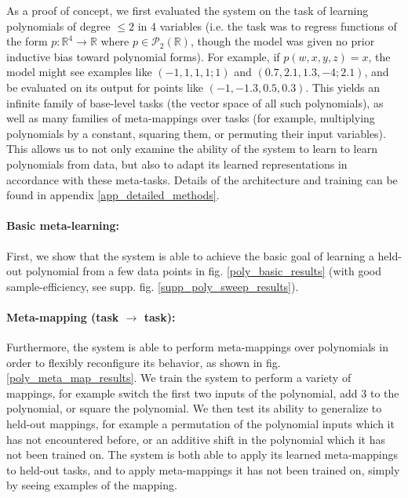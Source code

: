 \documentclass{article}
\begin{document}
As a proof of concept, we first evaluated the system on the task of learning polynomials of degree $\leq 2$ in 4 variables (i.e. the task was to regress functions of the form $p: \mathbb{R}^4 \rightarrow \mathbb{R}$ where $p \in \mathcal{P}_2 \left(\mathbb{R}\right)$, though the model was given no prior inductive bias toward polynomial forms). For example, if $p(w,x,y,z) = x$, the model might see examples like $(-1,1,1,1; 1)$ and $(0.7, 2.1, 1.3, -4; 2.1)$, and be evaluated on its output for points like $(-1, -1.3, 0.5, 0.3)$. This yields an infinite family of base-level tasks (the vector space of all such polynomials), as well as many families of meta-mappings over tasks (for example, multiplying polynomials by a constant, squaring them, or permuting their input variables). This allows us to not only examine the ability of the system to learn to learn polynomials from data, but also to adapt its learned representations in accordance with these meta-tasks. Details of the architecture and training can be found in appendix \ref{app_detailed_methods}.\par
\vspace{-0.7em}
\paragraph{Basic meta-learning:} First, we show that the system is able to achieve the basic goal of learning a held-out polynomial from a few data points in fig. \ref{poly_basic_results} (with good sample-efficiency, see supp. fig. \ref{supp_poly_sweep_results}). \par 
\vspace{-0.7em}
\paragraph{Meta-mapping (task $\rightarrow$ task):} Furthermore, the system is able to perform meta-mappings over polynomials in order to flexibly reconfigure its behavior, as shown in fig. \ref{poly_meta_map_results}. We train the system to perform a variety of mappings, for example switch the first two inputs of the polynomial, add 3 to the polynomial, or square the polynomial. We then test its ability to generalize to held-out mappings, for example a permutation of the polynomial inputs which it has not encountered before, or an additive shift in the polynomial which it has not been trained on. The system is both able to apply its learned meta-mappings to held-out tasks, and to apply meta-mappings it has not been trained on, simply by seeing examples of the mapping. \par 
\end{document}
